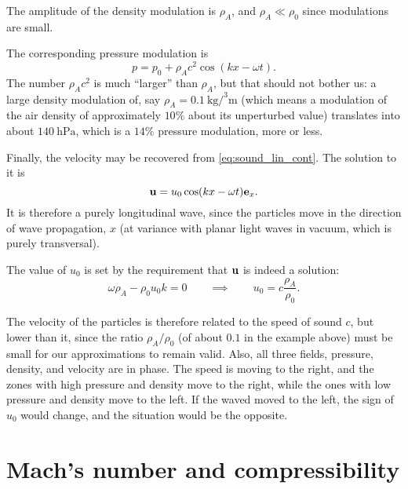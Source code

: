 The amplitude of the density modulation is $\rho_A$, and $\rho_A \ll
\rho_0$ since modulations are small.

The corresponding pressure modulation is
\[
p =  p_0 + \rho_A c^2  \cos(k x  - \omega t) .
\]
The number $ \rho_A c^2 $ is much ``larger'' than $\rho_A$, but that
should not bother us: a large density modulation of, say $\rho_A=
{\SI{0.1}{\kilo\gram\per\cubed\meter}}$ (which means a modulation of
the air density of approximately $10\%$ about its unperturbed value)
translates into about ${\SI{140}{\hecto\pascal}}$, which is a $14\%$
pressure modulation, more or less.

Finally, the velocity may be recovered from \ref{eq:sound_lin_cont}. The
solution to it is
\[
\mathbf{u} = u_0  \cos(k x  - \omega t) \mathbf{e}_x .
\]
It is therefore a purely longitudinal wave, since the particles move
in the direction of wave propagation, $x$ (at variance with planar
light waves in vacuum, which is purely transversal).

The value of $u_0$ is set by the requirement that $\mathbf{u}$ is indeed a
solution:
\[
\omega \rho_A - \rho_0 u_0 k = 0 \qquad\implies\qquad
u_0 = c \frac{\rho_A}{\rho_0} .
\]

The velocity of the particles is therefore related to the speed of
sound $c$, but lower than it, since the ratio $\rho_A / \rho_0$ (of
about $0.1$ in the example above) must be small for our approximations
to remain valid. Also, all three fields, pressure, density, and
velocity are in phase. The speed is moving to the right, and the zones
with high pressure and density move to the right, while the ones with
low pressure and density move to the left. If the waved moved to the
left, the sign of $u_0$ would change, and the situation would be the
opposite.


\section{Mach's number and compressibility}
